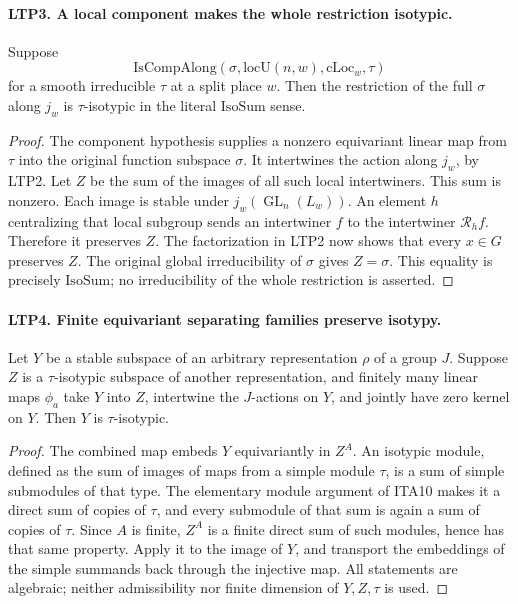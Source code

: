 \paragraph{LTP3. A local component makes the whole restriction isotypic.}
\label{claim:LTP3}
Suppose
\[
 \mathrm{IsCompAlong}\!
 \left(\sigma,\mathrm{locU}(n,w),\mathrm{cLoc}_w,\tau\right)
\]
for a smooth irreducible \(\tau\) at a split place \(w\).
Then the restriction of the full \(\sigma\) along \(j_w\) is
\(\tau\)-isotypic in the literal \(\mathrm{IsoSum}\) sense.
\begin{proof}
The component hypothesis supplies a nonzero equivariant linear map
from \(\tau\) into the original function subspace \(\sigma\).  It
intertwines the action along \(j_w\), by LTP2.  Let \(Z\) be the sum
of the images of all such local intertwiners.  This sum is nonzero.
Each image is stable under \(j_w(\operatorname{GL}_n(L_w))\).
An element \(h\) centralizing that local subgroup sends an intertwiner
\(f\) to the intertwiner \(\mathscr R_hf\).  Therefore it preserves
\(Z\).  The factorization in LTP2 now shows that every \(x\in G\)
preserves \(Z\).  The original global irreducibility of \(\sigma\)
gives \(Z=\sigma\).  This equality is precisely \(\mathrm{IsoSum}\);
no irreducibility of the whole restriction is asserted.
\end{proof}

\paragraph{LTP4. Finite equivariant separating families preserve isotypy.}
\label{claim:LTP4}
Let \(Y\) be a stable subspace of an arbitrary representation
\(\rho\) of a group \(J\).  Suppose \(Z\) is a \(\tau\)-isotypic
subspace of another representation, and finitely many linear maps
\(\phi_a\) take \(Y\) into \(Z\), intertwine the \(J\)-actions on
\(Y\), and jointly have zero kernel on \(Y\).  Then \(Y\) is
\(\tau\)-isotypic.
\begin{proof}
The combined map embeds \(Y\) equivariantly in \(Z^A\).
An isotypic module, defined as the sum of images of maps from a
simple module \(\tau\), is a sum of simple submodules of that type.
The elementary module argument of ITA10 makes it a direct sum of
copies of \(\tau\), and every submodule of that sum is again a sum
of copies of \(\tau\).  Since \(A\) is finite, \(Z^A\) is a finite
direct sum of such modules, hence has that same property.  Apply
it to the image of \(Y\), and transport the embeddings of the
simple summands back through the injective map.
All statements are algebraic; neither admissibility nor finite
dimension of \(Y,Z,\tau\) is used.
\end{proof}

